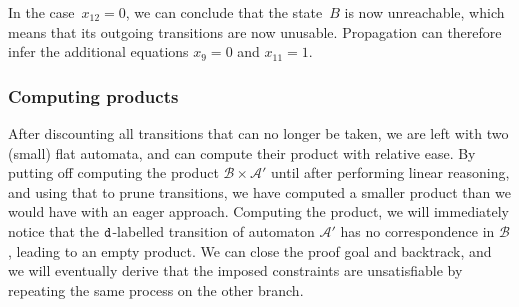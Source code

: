 In the case~$x_{12} = 0$, we can conclude
that the state~$B$ is now unreachable, which means that its outgoing transitions are now unusable. Propagation can
therefore infer the additional equations $x_9 = 0$ and $x_{11} = 1$.


\subsubsection{Computing products}\label{sec:intuition:materialise}
After discounting all transitions that can no longer be taken, we are
left with two (small) flat automata, and can compute their product with
relative ease. By putting off computing the product $\mathcal{B} \times \mathcal{A}'$ until after
performing linear reasoning, and using that to prune transitions, we
have computed a smaller product than we would have with an eager
approach. Computing the product, we will immediately notice that the
$\texttt{d}$-labelled transition of automaton $\mathcal{A}'$ has no correspondence
in $\mathcal{B}$, leading to an empty product. We can close the proof goal and
backtrack, and we will eventually derive that the imposed constraints are
unsatisfiable by repeating the same process on the other branch.

